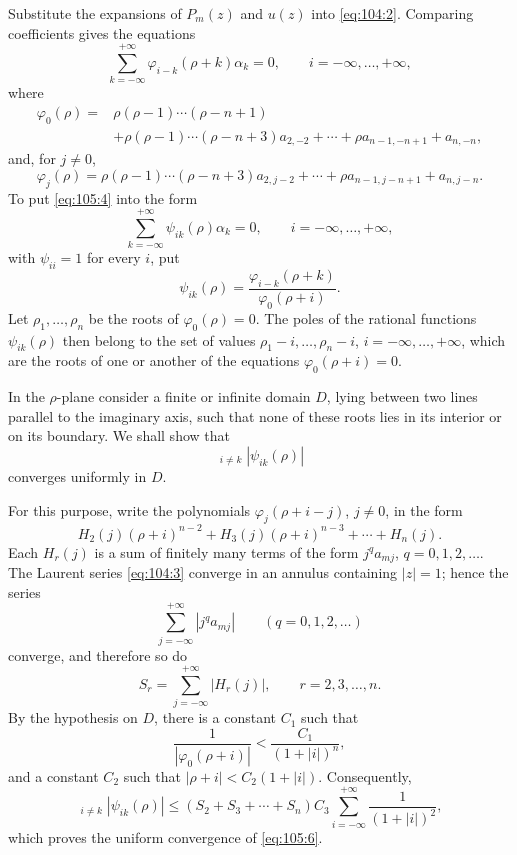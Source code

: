 \documentclass[
  paper=b5,
  fontsize=13pt,
  twoside=true,
  open=any,
  bookmarkpackage=false,
  chapterprefix=true,
  headings=normal
]{scrbook}
\theoremstyle{definition}
\begin{document}
Substitute the expansions of \(P_m(z)\) and \(u(z)\) into
\eqref{eq:104:2}.  Comparing coefficients gives the equations
\begin{equation}
  \sum_{k=-\infty}^{+\infty}\varphi_{i-k}(\rho+k)\alpha_k=0,
  \qquad i=-\infty,\ldots,+\infty,
  \tag{4}\label{eq:105:4}
\end{equation}
where
\begin{align*}
  \varphi_0(\rho)
  ={}&\rho(\rho-1)\cdots(\rho-n+1)\\
  &+\rho(\rho-1)\cdots(\rho-n+3)a_{2,-2}
  +\cdots+\rho a_{n-1,-n+1}+a_{n,-n},
\end{align*}
and, for \(j\ne0\),
\[
  \varphi_j(\rho)
  =\rho(\rho-1)\cdots(\rho-n+3)a_{2,j-2}
  +\cdots+\rho a_{n-1,j-n+1}+a_{n,j-n}.
\]
To put \eqref{eq:105:4} into the form
\begin{equation}
  \sum_{k=-\infty}^{+\infty}\psi_{ik}(\rho)\alpha_k=0,
  \qquad i=-\infty,\ldots,+\infty,
  \tag{5}\label{eq:105:5}
\end{equation}
with \(\psi_{ii}=1\) for every \(i\), put
\[
  \psi_{ik}(\rho)=
  \frac{\varphi_{i-k}(\rho+k)}{\varphi_0(\rho+i)}.
\]
Let \(\rho_1,\ldots,\rho_n\) be the roots of
\(\varphi_0(\rho)=0\).  The poles of the rational functions
\(\psi_{ik}(\rho)\) then belong to the set of values
\(\rho_1-i,\ldots,\rho_n-i\), \(i=-\infty,\ldots,+\infty\), which are the
roots of one or another of the equations \(\varphi_0(\rho+i)=0\).

In the \(\rho\)-plane consider a finite or infinite domain \(D\), lying
between two lines parallel to the imaginary axis, such that none of these
roots lies in its interior or on its boundary.  We shall show that
\begin{equation}
  \mathop{\sum_{i,k=-\infty}^{+\infty}}_{i\ne k}
  |\psi_{ik}(\rho)|
  \tag{6}\label{eq:105:6}
\end{equation}
converges uniformly in \(D\).

For this purpose, write the polynomials
\(\varphi_j(\rho+i-j)\), \(j\ne0\), in the form
\[
  H_2(j)(\rho+i)^{n-2}+H_3(j)(\rho+i)^{n-3}
  +\cdots+H_n(j).
\]
Each \(H_r(j)\) is a sum of finitely many terms of the form
\(j^qa_{mj}\), \(q=0,1,2,\ldots\).  The Laurent series
\eqref{eq:104:3} converge in an annulus containing \(|z|=1\); hence the
series
\[
  \sum_{j=-\infty}^{+\infty}|j^qa_{mj}|
  \qquad(q=0,1,2,\ldots)
\]
converge, and therefore so do
\[
  S_r=\sum_{j=-\infty}^{+\infty}|H_r(j)|,
  \qquad r=2,3,\ldots,n.
\]
By the hypothesis on \(D\), there is a constant \(C_1\) such that
\[
  \frac1{|\varphi_0(\rho+i)|}<\frac{C_1}{(1+|i|)^n},
\]
and a constant \(C_2\) such that
\(|\rho+i|<C_2(1+|i|)\).  Consequently,
\[
  \mathop{\sum_{i,k=-\infty}^{+\infty}}_{i\ne k}
  |\psi_{ik}(\rho)|
  \le (S_2+S_3+\cdots+S_n)C_3
  \sum_{i=-\infty}^{+\infty}\frac1{(1+|i|)^2},
\]
which proves the uniform convergence of \eqref{eq:105:6}.
\end{document}
